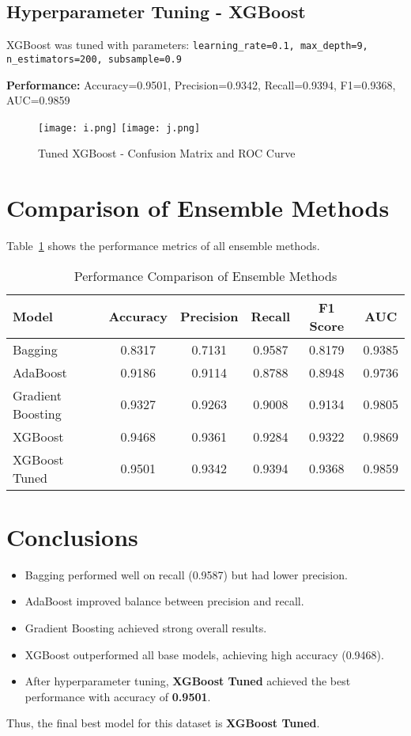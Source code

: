 \documentclass[12pt]{article}
\begin{document}
\subsection{Hyperparameter Tuning - XGBoost}
XGBoost was tuned with parameters:  
\texttt{learning\_rate=0.1, max\_depth=9, n\_estimators=200, subsample=0.9}  

\textbf{Performance:}  
Accuracy=0.9501, Precision=0.9342, Recall=0.9394, F1=0.9368, AUC=0.9859  

\begin{figure}[h!]
\centering
\texttt{[image: i.png]}
\texttt{[image: j.png]}
\caption{Tuned XGBoost - Confusion Matrix and ROC Curve}
\end{figure}

\section{Comparison of Ensemble Methods}
Table~\ref{tab:comparison} shows the performance metrics of all ensemble methods.  

\begin{table}[h!]
\centering
\begin{tabular}{lccccc}
\toprule
Model & Accuracy & Precision & Recall & F1 Score & AUC \\
\midrule
Bagging & 0.8317 & 0.7131 & 0.9587 & 0.8179 & 0.9385 \\
AdaBoost & 0.9186 & 0.9114 & 0.8788 & 0.8948 & 0.9736 \\
Gradient Boosting & 0.9327 & 0.9263 & 0.9008 & 0.9134 & 0.9805 \\
XGBoost & 0.9468 & 0.9361 & 0.9284 & 0.9322 & 0.9869 \\
XGBoost Tuned & 0.9501 & 0.9342 & 0.9394 & 0.9368 & 0.9859 \\
\bottomrule
\end{tabular}
\caption{Performance Comparison of Ensemble Methods}
\label{tab:comparison}
\end{table}

\section{Conclusions}
\begin{itemize}
    \item Bagging performed well on recall (0.9587) but had lower precision.
    \item AdaBoost improved balance between precision and recall.
    \item Gradient Boosting achieved strong overall results.
    \item XGBoost outperformed all base models, achieving high accuracy (0.9468).
    \item After hyperparameter tuning, \textbf{XGBoost Tuned} achieved the best performance with accuracy of \textbf{0.9501}.
\end{itemize}

Thus, the final best model for this dataset is \textbf{XGBoost Tuned}.
\end{document}
